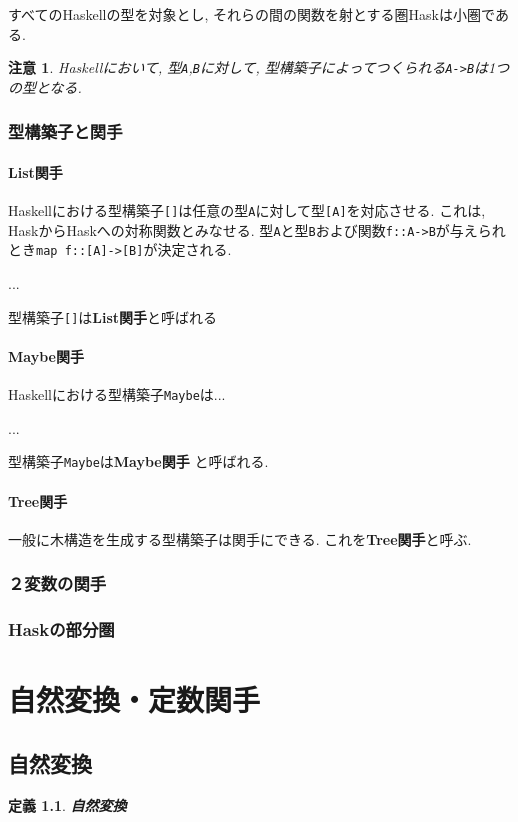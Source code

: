 \documentclass{jsbook}
\theoremstyle{plain}
\newtheorem{Def}{定義}[chapter]
\newtheorem{caution}{注意}[chapter]
\begin{document}
すべてのHaskellの型を対象とし, それらの間の関数を射とする圏Haskは小圏である.
\begin{caution}
Haskellにおいて, 型\verb|A|,\verb|B|に対して, 型構築子によってつくられる\verb|A->B|は1つの型となる.
\end{caution}

\subsection{型構築子と関手}
\subsubsection{List関手}
Haskellにおける型構築子\verb|[]|は任意の型\verb|A|に対して型\verb|[A]|を対応させる.
これは, HaskからHaskへの対称関数とみなせる.
型\verb|A|と型\verb|B|および関数\verb|f::A->B|が与えられとき\verb|map f::[A]->[B]|が決定される.

...

型構築子\verb|[]|は{\bf List関手}と呼ばれる
\subsubsection{Maybe関手}
Haskellにおける型構築子\verb|Maybe|は...

...

型構築子\verb|Maybe|は{\bf Maybe関手}
と呼ばれる.
\subsubsection{Tree関手}
一般に木構造を生成する型構築子は関手にできる. これを{\bf Tree関手}と呼ぶ.


\subsection{２変数の関手}
\subsection{Haskの部分圏}
\chapter{自然変換・定数関手}
\section{自然変換}
\begin{Def}
{\bf 自然変換}
\end{Def}
\end{document}
